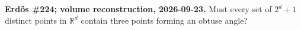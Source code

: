\textbf{Erd\H{o}s \#224; volume reconstruction, 2026-09-23.}
Must every set of $2^d+1$ distinct points in $\mathbb R^d$ contain three points forming an obtuse angle?
